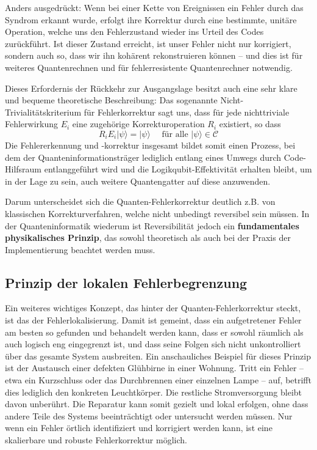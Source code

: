 Anders ausgedrückt: Wenn bei einer Kette von Ereignissen ein Fehler durch das Syndrom erkannt wurde, erfolgt ihre Korrektur durch eine bestimmte, unitäre Operation, welche uns den Fehlerzustand wieder ins Urteil des Codes zurückführt. Ist dieser Zustand erreicht, ist unser Fehler nicht nur korrigiert, sondern auch so, dass wir ihn kohärent rekonstruieren können – und dies ist für weiteres Quantenrechnen und für fehlerresistente Quantenrechner notwendig.

Dieses Erfordernis der Rückkehr zur Ausgangslage besitzt auch eine sehr klare und bequeme theoretische Beschreibung: Das sogenannte Nicht-Trivialitätskriterium für Fehlerkorrektur sagt uns, dass für jede nichttriviale Fehlerwirkung \(E_i\) eine zugehörige Korrekturoperation \(R_i\) existiert, so dass 
\begin{equation}
    R_{i} E_{i}|\psi\rangle=|\psi\rangle \quad \text { für alle }|\psi\rangle \in \mathcal{C}
\end{equation}
Die Fehlererkennung und -korrektur insgesamt bildet somit einen Prozess, bei dem der Quanteninformationsträger lediglich entlang eines Umwegs durch Code-Hilfsraum entlanggeführt wird und die Logikqubit-Effektivität erhalten bleibt, um in der Lage zu sein, auch weitere Quantengatter auf diese anzuwenden.

Darum unterscheidet sich die Quanten-Fehlerkorrektur deutlich z.B. von klassischen Korrekturverfahren, welche nicht unbedingt reversibel sein müssen. In der Quanteninformatik wiederum ist Reversibilität jedoch ein \textbf{fundamentales physikalisches Prinzip}, das sowohl theoretisch als auch bei der Praxis der Implementierung beachtet werden muss.

\subsection{Prinzip der lokalen Fehlerbegrenzung}
Ein weiteres wichtiges Konzept, das hinter der Quanten-Fehlerkorrektur steckt, ist das der Fehlerlokalisierung. Damit ist gemeint, dass ein aufgetretener Fehler am besten so gefunden und behandelt werden kann, dass er sowohl räumlich als auch logisch eng eingegrenzt ist, und dass seine Folgen sich nicht unkontrolliert über das gesamte System ausbreiten. Ein anschauliches Beispiel für dieses Prinzip ist der Austausch einer defekten Glühbirne in einer Wohnung. Tritt ein Fehler – etwa ein Kurzschluss oder das Durchbrennen einer einzelnen Lampe – auf, betrifft dies lediglich den konkreten Leuchtkörper. Die restliche Stromversorgung bleibt davon unberührt. Die Reparatur kann somit gezielt und lokal erfolgen, ohne dass andere Teile des Systems beeinträchtigt oder untersucht werden müssen. Nur wenn ein Fehler örtlich identifiziert und korrigiert werden kann, ist eine skalierbare und robuste Fehlerkorrektur möglich.\cite[Seite 451-452]{nielsen_quantum_2010}


